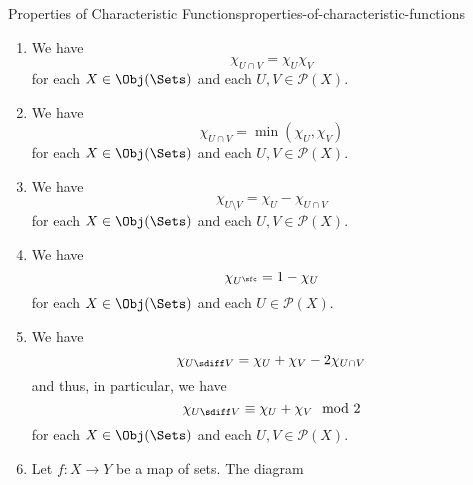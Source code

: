 \begin{proposition}{Properties of Characteristic Functions}{properties-of-characteristic-functions}
\begin{enumerate}
            \[
                \chi_{U\cup V}%
                =%
                \chi_{U}+\chi_{V}-\chi_{U\cap V}%
            \]%
            for each $X\in\Obj(\Sets)$ and each $U,V\in\mathcal{P}(X)$.
        \item\label{properties-of-characteristic-functions-interaction-with-intersections-1}We have
            \[
                \chi_{U\cap V}%
                =%
                \chi_{U}\chi_{V}%
            \]%
            for each $X\in\Obj(\Sets)$ and each $U,V\in\mathcal{P}(X)$.
        \item\label{properties-of-characteristic-functions-interaction-with-intersections-2}We have
            \[
                \chi_{U\cap V}%
                =%
                \min(\chi_{U},\chi_{V})%
            \]%
            for each $X\in\Obj(\Sets)$ and each $U,V\in\mathcal{P}(X)$.
        \item\label{properties-of-characteristic-functions-interaction-with-differences}We have
            \[
                \chi_{U\setminus V}%
                =%
                \chi_{U}%
                -%
                \chi_{U\cap V}%
            \]%
            for each $X\in\Obj(\Sets)$ and each $U,V\in\mathcal{P}(X)$.
        \item\label{properties-of-characteristic-functions-interaction-with-complements}We have
            \[
                \chi_{U^{\sfc}}%
                =%
                1-\chi_{U}%
            \]%
            for each $X\in\Obj(\Sets)$ and each $U\in\mathcal{P}(X)$.
        \item\label{properties-of-characteristic-functions-interaction-with-symmetric-differences}We have
            \[
                \chi_{U\sdiff V}%
                =%
                \chi_{U}%
                +%
                \chi_{V}%
                -%
                2\chi_{U\cap V}%
            \]%
            and thus, in particular, we have
            \[
                \chi_{U\sdiff V}%
                \equiv%
                \chi_{U}+\chi_{V}%
                \mod{2}%
            \]%
            for each $X\in\Obj(\Sets)$ and each $U,V\in\mathcal{P}(X)$.
        \item\label{properties-of-characteristic-functions-interaction-between-the-characteristic-embedding-and-morphisms}Let $f\colon X\to Y$ be a map of sets. The diagram

\end{enumerate}
\end{proposition}

